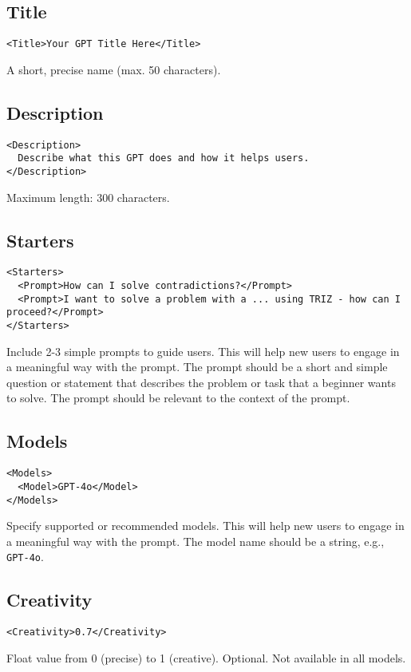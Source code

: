 \documentclass[a4paper,11pt]{refart}
\begin{document}
\subsection{Title}
\begin{lstlisting}
<Title>Your GPT Title Here</Title>
\end{lstlisting}
A short, precise name (max. 50 characters).

\subsection{Description}
\begin{lstlisting}
<Description>
  Describe what this GPT does and how it helps users.
</Description>
\end{lstlisting}
Maximum length: 300 characters.

\subsection{Starters}
\begin{lstlisting}
<Starters>
  <Prompt>How can I solve contradictions?</Prompt>
  <Prompt>I want to solve a problem with a ... using TRIZ - how can I proceed?</Prompt>
</Starters>
\end{lstlisting}
Include 2-3 simple prompts to guide users. This will help new users to engage in a meaningful way with the prompt. The prompt should be a short and simple question or statement that describes the problem or task that a beginner wants to solve. The prompt should be relevant to the context of the prompt.

\subsection{Models}
\begin{lstlisting}
<Models>
  <Model>GPT-4o</Model>
</Models>
\end{lstlisting}
Specify supported or recommended models. This will help new users to engage in a meaningful way with the prompt. The model name should be a string, e.g., \texttt{GPT-4o}.

\subsection{Creativity}
\begin{lstlisting}
<Creativity>0.7</Creativity>
\end{lstlisting}
Float value from 0 (precise) to 1 (creative). Optional. Not available in all models.
\end{document}
